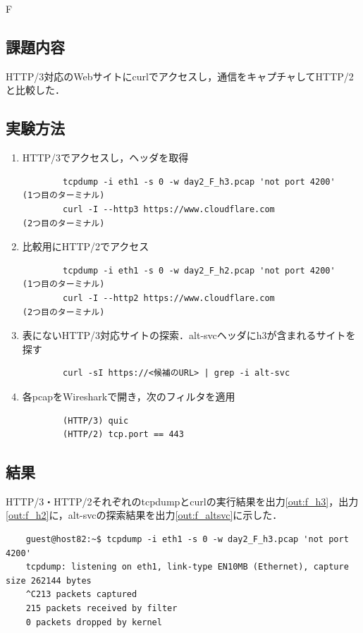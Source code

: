 \begin{maintask}{F}
  \subsection*{課題内容}
  HTTP/3対応のWebサイトにcurlでアクセスし，通信をキャプチャしてHTTP/2と比較した．

  \subsection*{実験方法}
  \begin{enumerate}
    \item HTTP/3でアクセスし，ヘッダを取得
      \begin{verbatim}
        tcpdump -i eth1 -s 0 -w day2_F_h3.pcap 'not port 4200'    (1つ目のターミナル)
        curl -I --http3 https://www.cloudflare.com                (2つ目のターミナル)
      \end{verbatim}

    \item 比較用にHTTP/2でアクセス
      \begin{verbatim}
        tcpdump -i eth1 -s 0 -w day2_F_h2.pcap 'not port 4200'    (1つ目のターミナル)
        curl -I --http2 https://www.cloudflare.com                (2つ目のターミナル)
      \end{verbatim}

    \item 表にないHTTP/3対応サイトの探索．alt-svcヘッダにh3が含まれるサイトを探す
      \begin{verbatim}
        curl -sI https://<候補のURL> | grep -i alt-svc
      \end{verbatim}

    \item 各pcapをWiresharkで開き，次のフィルタを適用
      \begin{verbatim}
        (HTTP/3) quic
        (HTTP/2) tcp.port == 443
      \end{verbatim}
  \end{enumerate}

  \subsection*{結果}
  HTTP/3・HTTP/2それぞれのtcpdumpとcurlの実行結果を出力\ref{out:f_h3}，出力\ref{out:f_h2}に，alt-svcの探索結果を出力\ref{out:f_altsvc}に示した．

  \begin{termout}[H]
    \caption{HTTP/3 の tcpdump と curl の実行結果}\label{out:f_h3}
    \begin{verbatim}
    guest@host82:~$ tcpdump -i eth1 -s 0 -w day2_F_h3.pcap 'not port 4200'
    tcpdump: listening on eth1, link-type EN10MB (Ethernet), capture size 262144 bytes
    ^C213 packets captured
    215 packets received by filter
    0 packets dropped by kernel
    

\end{verbatim}
\end{termout}
\end{maintask}
